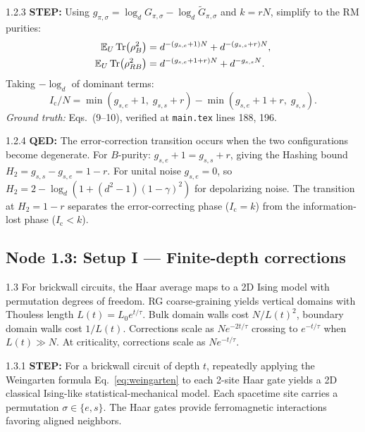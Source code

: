 \documentclass[11pt,a4paper]{article}
\newcommand{\Ic}{I_{\mathrm{c}}}
\newcommand{\Ex}{\mathbb{E}}
\begin{document}
\begin{proofnode}{1.2.3}
\textbf{STEP:} Using $g_{\pi,\sigma} = \log_d G_{\pi,\sigma} - \log_d \tilde{G}_{\pi,\sigma}$ and $k=rN$, simplify to the RM purities:
\begin{align}
    \Ex_U \Tr(\rho_B^2) &= d^{-(g_{s,e}+1)N} + d^{-(g_{s,s}+r)N}, \label{eq:RM_purB}\\
    \Ex_U \Tr(\rho_{RB}^2) &= d^{-(g_{s,e}+1+r)N} + d^{-g_{s,s}N}. \label{eq:RM_purRB}
\end{align}
Taking $-\log_d$ of dominant terms:
\begin{equation}
    \Ic/N = \min(g_{s,e}+1,\; g_{s,s}+r) - \min(g_{s,e}+1+r,\; g_{s,s}).
    \label{eq:Ic_RM}
\end{equation}
\textit{Ground truth:} Eqs.~(9--10), verified at \texttt{main.tex} lines 188, 196.
\end{proofnode}

\begin{proofnode}{1.2.4}
\textbf{QED:} The error-correction transition occurs when the two configurations become degenerate. For $B$-purity: $g_{s,e}+1 = g_{s,s}+r$, giving the Hashing bound $H_2 = g_{s,s}-g_{s,e} = 1-r$. For unital noise $g_{s,e}=0$, so $H_2 = 2-\log_d(1+(d^2-1)(1-\gamma)^2)$ for depolarizing noise. The transition at $H_2=1-r$ separates the error-correcting phase ($\Ic=k$) from the information-lost phase ($\Ic < k$).
\end{proofnode}

\subsection{Node 1.3: Setup I --- Finite-depth corrections}
\label{sec:node13}

\begin{proofnode}{1.3}
For brickwall circuits, the Haar average maps to a 2D Ising model with permutation degrees of freedom. RG coarse-graining yields vertical domains with Thouless length $L(t) = L_0 e^{t/\tau}$. Bulk domain walls cost $N/L(t)^2$, boundary domain walls cost $1/L(t)$. Corrections scale as $N e^{-2t/\tau}$ crossing to $e^{-t/\tau}$ when $L(t) \gg N$. At criticality, corrections scale as $N e^{-t/\tau}$.
\end{proofnode}

\begin{proofnode}{1.3.1}
\textbf{STEP:} For a brickwall circuit of depth $t$, repeatedly applying the Weingarten formula Eq.~\eqref{eq:weingarten} to each 2-site Haar gate yields a 2D classical Ising-like statistical-mechanical model. Each spacetime site carries a permutation $\sigma \in \{e, s\}$. The Haar gates provide ferromagnetic interactions favoring aligned neighbors.
\end{proofnode}
\end{document}
